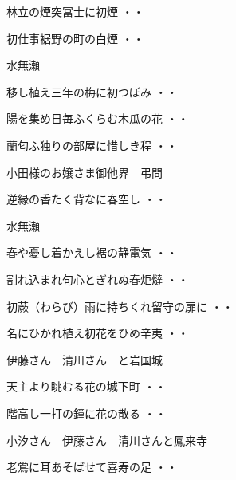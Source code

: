 \begin{shiika}林立の煙突冨士に初煙
\hfill{・・}\end{shiika}
\begin{shiika}初仕事裾野の町の白煙
\hfill{・・}\end{shiika}
\vspace{0.6cm}
水無瀬
\begin{shiika}移し植え三年の梅に初つぼみ
\hfill{・・}\end{shiika}
\begin{shiika}陽を集め日毎ふくらむ木瓜の花
\hfill{・・}\end{shiika}
\begin{shiika}蘭匂ふ独りの部屋に惜しき程
\hfill{・・}\end{shiika}
\vspace{0.6cm}
小田様のお嬢さま御他界　弔問
\begin{shiika}逆縁の香たく背なに春空し
\hfill{・・}\end{shiika}
\vspace{0.6cm}
水無瀬
\begin{shiika}春や憂し着かえし裾の静電気
\hfill{・・}\end{shiika}
\begin{shiika}割れ込まれ句心とぎれぬ春炬燵
\hfill{・・}\end{shiika}
\begin{shiika}初蕨（わらび）雨に持ちくれ留守の扉に
\hfill{・・}\end{shiika}
\begin{shiika}名にひかれ植え初花をひめ辛夷
\hfill{・・}\end{shiika}
\vspace{0.6cm}
伊藤さん　清川さん　と岩国城
\begin{shiika}天主より眺むる花の城下町
\hfill{・・}\end{shiika}
\begin{shiika}階高し一打の鐘に花の散る
\hfill{・・}\end{shiika}
\vspace{0.6cm}
小汐さん　伊藤さん　清川さんと鳳来寺
\begin{shiika}老鴬に耳あそばせて喜寿の足
\hfill{・・}\end{shiika}
